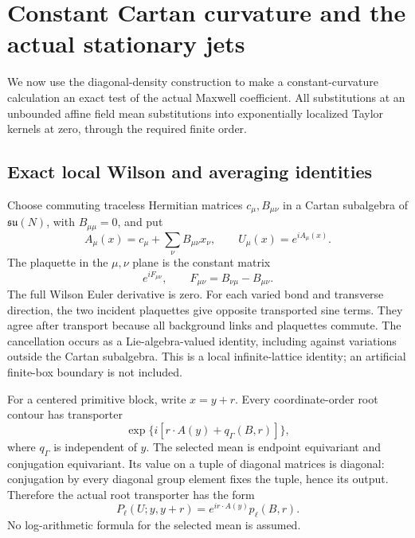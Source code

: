 \section{Constant Cartan curvature and the actual stationary jets}
\label{cdmom-section}

We now use the diagonal-density construction to make a
constant-curvature calculation an exact test of the actual
Maxwell coefficient. All substitutions at an unbounded
affine field mean substitutions into exponentially localized
Taylor kernels at zero, through the required finite order.

\subsection{Exact local Wilson and averaging identities}
\label{cdmom-affine-section}

Choose commuting traceless Hermitian matrices \(c_\mu,B_{\mu\nu}\)
in a Cartan subalgebra of \(\mathfrak{su}(N)\), with
\(B_{\mu\mu}=0\), and put
\begin{equation}
 A_\mu(x)=c_\mu+\sum_\nu B_{\mu\nu}x_\nu,\qquad
 U_\mu(x)=e^{iA_\mu(x)}.
 \label{cdmom-affine}
\end{equation}
The plaquette in the \(\mu,\nu\) plane is the constant matrix
\[
 e^{iF_{\mu\nu}},\qquad F_{\mu\nu}=B_{\nu\mu}-B_{\mu\nu}.
\]
The full Wilson Euler derivative is zero. For each varied
bond and transverse direction, the two incident plaquettes
give opposite transported sine terms. They agree after
transport because all background links and plaquettes
commute. The cancellation occurs as a Lie-algebra-valued
identity, including against variations outside the Cartan
subalgebra. This is a local infinite-lattice identity;
an artificial finite-box boundary is not included.

For a centered primitive block, write \(x=y+r\).
Every coordinate-order root contour has transporter
\[
 \exp\{i[r\cdot A(y)+q_\Gamma(B,r)]\},
\]
where \(q_\Gamma\) is independent of \(y\).
The selected mean is endpoint equivariant and conjugation
equivariant. Its value on a tuple of diagonal matrices
is diagonal: conjugation by every diagonal group element
fixes the tuple, hence its output. Therefore the actual
root transporter has the form
\begin{equation}
 P_\ell(U;y,y+r)=e^{ir\cdot A(y)}p_\ell(B,r).
 \label{cdmom-contour}
\end{equation}
No log-arithmetic formula for the selected mean is assumed.

